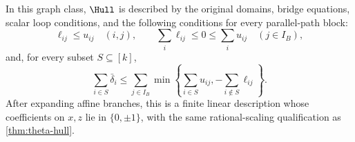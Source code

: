 \begin{theorem}\label{thm:parallel-hull}
In this graph class, $\Hull$ is described by the original domains, bridge
equations, scalar loop conditions, and the following conditions for every
parallel-path block:
\begin{equation}\label{eq:parallel-local}
 \ell_{ij}\le u_{ij}\quad(i,j),\qquad
 \sum_i\ell_{ij}\le0\le\sum_i u_{ij}\quad(j\in I_B),
\end{equation}
and, for every subset $S\subseteq[k]$,
\begin{equation}\label{eq:parallel-subset}
 \sum_{i\in S}\bar\delta_i\le
 \sum_{j\in I_B}\min\left\{\sum_{i\in S}u_{ij},
                           -\sum_{i\notin S}\ell_{ij}\right\}.
\end{equation}
After expanding affine branches, this is a finite linear description
whose coefficients on $x,z$ lie in $\{0,\pm1\}$, with the same
rational-scaling qualification as \cref{thm:theta-hull}.
\end{theorem}
